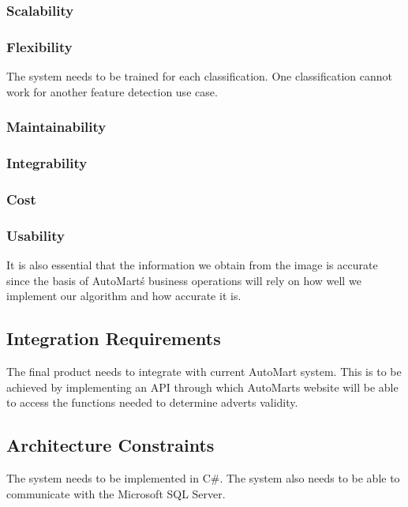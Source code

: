 \subsubsection{Scalability}

\subsubsection{Flexibility}
The system needs to be trained for each classification. One classification cannot work for another feature detection use case.
\subsubsection{Maintainability}

\subsubsection{Integrability}

\subsubsection{Cost}

\subsubsection{Usability}

It is also essential that the information we obtain from the image is accurate since the basis of AutoMart\'s business operations will rely on how well we implement our algorithm and how accurate it is.

\subsection{Integration Requirements}
The final product needs to integrate with current AutoMart system. This is to be achieved by implementing an API through which AutoMarts website will be able to access the functions needed to determine adverts validity.

\subsection{Architecture Constraints}
The system needs to be implemented in C\#. The system also needs to be able to communicate with the Microsoft SQL Server.